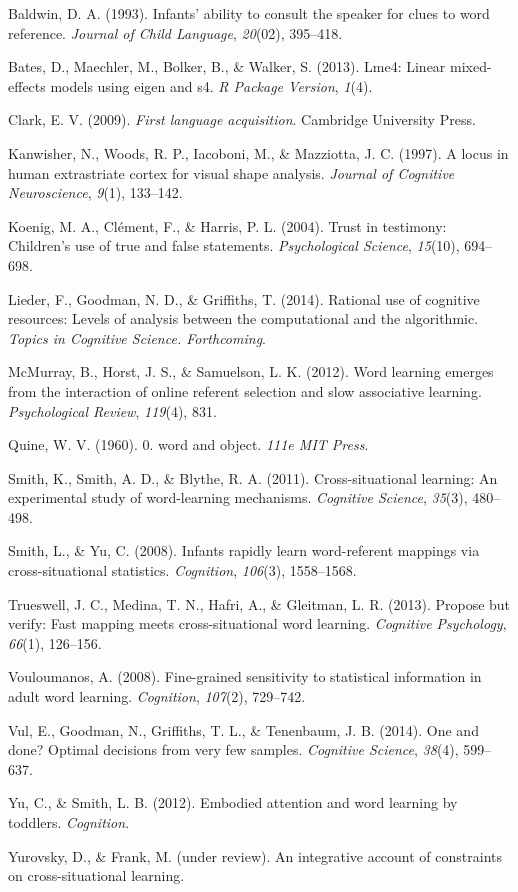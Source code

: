 \documentclass[12pt,]{article}
\begin{document}
Baldwin, D. A. (1993). Infants' ability to consult the speaker for clues
to word reference. \emph{Journal of Child Language}, \emph{20}(02),
395--418.

Bates, D., Maechler, M., Bolker, B., \& Walker, S. (2013). Lme4: Linear
mixed-effects models using eigen and s4. \emph{R Package Version},
\emph{1}(4).

Clark, E. V. (2009). \emph{First language acquisition}. Cambridge
University Press.

Kanwisher, N., Woods, R. P., Iacoboni, M., \& Mazziotta, J. C. (1997). A
locus in human extrastriate cortex for visual shape analysis.
\emph{Journal of Cognitive Neuroscience}, \emph{9}(1), 133--142.

Koenig, M. A., Cl{é}ment, F., \& Harris, P. L. (2004). Trust in
testimony: Children's use of true and false statements.
\emph{Psychological Science}, \emph{15}(10), 694--698.

Lieder, F., Goodman, N. D., \& Griffiths, T. (2014). Rational use of
cognitive resources: Levels of analysis between the computational and
the algorithmic. \emph{Topics in Cognitive Science. Forthcoming}.

McMurray, B., Horst, J. S., \& Samuelson, L. K. (2012). Word learning
emerges from the interaction of online referent selection and slow
associative learning. \emph{Psychological Review}, \emph{119}(4), 831.

Quine, W. V. (1960). 0. word and object. \emph{111e MIT Press}.

Smith, K., Smith, A. D., \& Blythe, R. A. (2011). Cross-situational
learning: An experimental study of word-learning mechanisms.
\emph{Cognitive Science}, \emph{35}(3), 480--498.

Smith, L., \& Yu, C. (2008). Infants rapidly learn word-referent
mappings via cross-situational statistics. \emph{Cognition},
\emph{106}(3), 1558--1568.

Trueswell, J. C., Medina, T. N., Hafri, A., \& Gleitman, L. R. (2013).
Propose but verify: Fast mapping meets cross-situational word learning.
\emph{Cognitive Psychology}, \emph{66}(1), 126--156.

Vouloumanos, A. (2008). Fine-grained sensitivity to statistical
information in adult word learning. \emph{Cognition}, \emph{107}(2),
729--742.

Vul, E., Goodman, N., Griffiths, T. L., \& Tenenbaum, J. B. (2014). One
and done? Optimal decisions from very few samples. \emph{Cognitive
Science}, \emph{38}(4), 599--637.

Yu, C., \& Smith, L. B. (2012). Embodied attention and word learning by
toddlers. \emph{Cognition}.

Yurovsky, D., \& Frank, M. (under review). An integrative account of
constraints on cross-situational learning.
\end{document}

